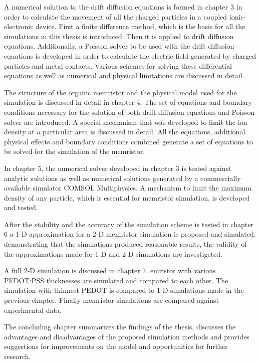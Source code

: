 \begin{doublespace}
A numerical solution to the drift diffusion equations is formed in chapter 3 in order to calculate the movement of all the charged particles in a coupled ionic-electronic device. First a finite difference method, which is the basis for all the simulations in this thesis is introduced. Then it is applied to  drift diffusion equations. Additionally, a Poisson solver to be used with the drift diffusion equations is developed in order to calculate the electric field generated by charged particles and metal contacts. Various schemes for solving these differential equations as well as numerical and physical limitations are discussed in detail.

The structure of the organic memristor and the physical model used for the simulation is discussed in detail in chapter 4. The set of equations and boundary conditions necessary for the solution of both  drift diffusion equations and  Poisson solver are introduced. A special mechanism that was developed to limit the ion density at a particular area is discussed in detail. All the equations, additional physical effects and boundary conditions combined generate a set of equations to be solved for the simulation of the memristor.
 
In chapter 5, the numerical solver developed in chapter 3 is tested against analytic solutions as well as numerical solutions generated by a commercially available simulator \tjs{(}COMSOL Multiphysics\tjs{)}\cite{Comsol}. A mechanism to limit the maximum density of any particle, which is essential for memristor simulation, is developed and tested. 

After the stability and the accuracy of the simulation scheme is tested in chapter 6 a 1-D approximation for a 2-D memristor simulation is proposed and simulated.  demonstrating that the simulations produced reasonable results, the validity of the approximations made for 1-D and 2-D simulations are investigeted.  

A full 2-D simulation is discussed in chapter 7. emristor with various PEDOT:PSS thicknesses are simulated and compared to each other. The simulation with thinnest PEDOT is compared to 1-D simulations made in the previous chapter. Finally memristor simulations are compared against experimental data.

The concluding chapter summarizes the findings of the thesis, discusses the advantages and disadvantages of the proposed simulation methods and provides suggestions for improvements on the model and opportunities for further research.


\end{doublespace}
